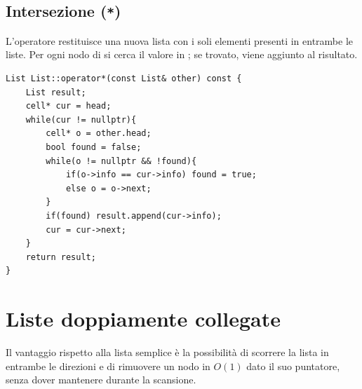 \subsection{Intersezione (\texttt{*})}
L'operatore \inlinecode{*} restituisce una nuova lista con i soli elementi presenti in entrambe le liste. Per ogni nodo di  si cerca il valore in ; se trovato, viene aggiunto al risultato.

\begin{codebox}
    \begin{lstlisting}
List List::operator*(const List& other) const {
    List result;
    cell* cur = head;
    while(cur != nullptr){
        cell* o = other.head;
        bool found = false;
        while(o != nullptr && !found){
            if(o->info == cur->info) found = true;
            else o = o->next;
        }
        if(found) result.append(cur->info);
        cur = cur->next;
    }
    return result;
}
    \end{lstlisting}
\end{codebox}


\section{Liste doppiamente collegate}


Il vantaggio rispetto alla lista semplice è la possibilità di scorrere la lista in
entrambe le direzioni e di rimuovere un nodo in $O(1)$ dato il suo puntatore, senza
dover mantenere  durante la scansione.

